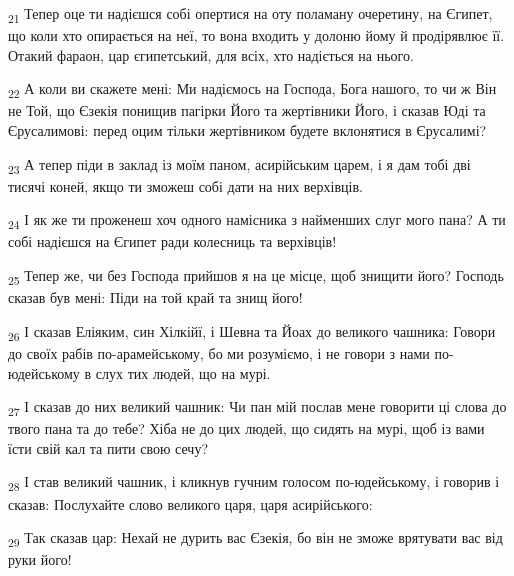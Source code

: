 \begin{tcolorbox}
\textsubscript{21} Тепер оце ти надієшся собі опертися на оту поламану очеретину, на Єгипет, що коли хто опирається на неї, то вона входить у долоню йому й продірявлює її. Отакий фараон, цар єгипетський, для всіх, хто надіється на нього.
\end{tcolorbox}
\begin{tcolorbox}
\textsubscript{22} А коли ви скажете мені: Ми надіємось на Господа, Бога нашого, то чи ж Він не Той, що Єзекія понищив пагірки Його та жертівники Його, і сказав Юді та Єрусалимові: перед оцим тільки жертівником будете вклонятися в Єрусалимі?
\end{tcolorbox}
\begin{tcolorbox}
\textsubscript{23} А тепер піди в заклад із моїм паном, асирійським царем, і я дам тобі дві тисячі коней, якщо ти зможеш собі дати на них верхівців.
\end{tcolorbox}
\begin{tcolorbox}
\textsubscript{24} І як же ти проженеш хоч одного намісника з найменших слуг мого пана? А ти собі надієшся на Єгипет ради колесниць та верхівців!
\end{tcolorbox}
\begin{tcolorbox}
\textsubscript{25} Тепер же, чи без Господа прийшов я на це місце, щоб знищити його? Господь сказав був мені: Піди на той край та знищ його!
\end{tcolorbox}
\begin{tcolorbox}
\textsubscript{26} І сказав Еліяким, син Хілкійї, і Шевна та Йоах до великого чашника: Говори до своїх рабів по-арамейському, бо ми розуміємо, і не говори з нами по-юдейському в слух тих людей, що на мурі.
\end{tcolorbox}
\begin{tcolorbox}
\textsubscript{27} І сказав до них великий чашник: Чи пан мій послав мене говорити ці слова до твого пана та до тебе? Хіба не до цих людей, що сидять на мурі, щоб із вами їсти свій кал та пити свою сечу?
\end{tcolorbox}
\begin{tcolorbox}
\textsubscript{28} І став великий чашник, і кликнув гучним голосом по-юдейському, і говорив і сказав: Послухайте слово великого царя, царя асирійського:
\end{tcolorbox}
\begin{tcolorbox}
\textsubscript{29} Так сказав цар: Нехай не дурить вас Єзекія, бо він не зможе врятувати вас від руки його!
\end{tcolorbox}
